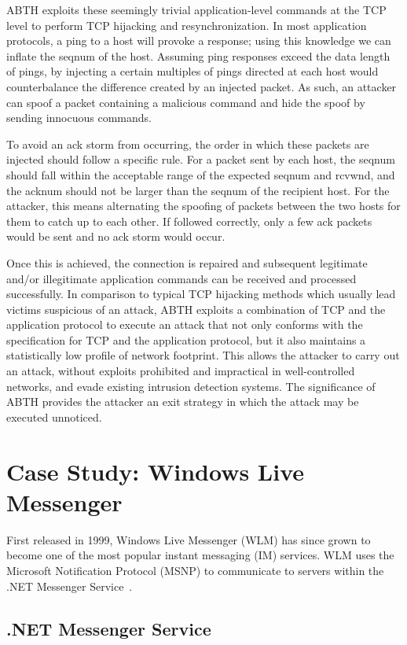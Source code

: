 \documentclass{sig-alternate}
\begin{document}
ABTH exploits these seemingly trivial application-level commands at the TCP level to perform TCP hijacking and resynchronization.
In most application protocols, a ping to a host will provoke a response; using this knowledge we can inflate the seqnum of the host.
Assuming ping responses exceed the data length of pings, by injecting a certain multiples of pings directed at each host would counterbalance the difference created by an injected packet.
As such, an attacker can spoof a packet containing a malicious command and hide the spoof by sending innocuous commands.

To avoid an ack storm from occurring, the order in which these packets are injected should follow a specific rule.
For a packet sent by each host, the seqnum should fall within the acceptable range of the expected seqnum and rcvwnd, and the acknum should not be larger than the seqnum of the recipient host.
For the attacker, this means alternating the spoofing of packets between the two hosts for them to catch up to each other.
If followed correctly, only a few ack packets would be sent and no ack storm would occur.

Once this is achieved, the connection is repaired and subsequent legitimate and/or illegitimate application commands can be received and processed successfully.
In comparison to typical TCP hijacking methods which usually lead victims suspicious of an attack, ABTH exploits a combination of TCP and the application protocol to execute an attack that not only conforms with the specification for TCP and the application protocol, but it also maintains a statistically low profile of network footprint.
This allows the attacker to carry out an attack, without exploits prohibited and impractical in well-controlled networks, and evade existing intrusion detection systems.
The significance of ABTH provides the attacker an exit strategy in which the attack may be executed unnoticed.

\section{Case Study: Windows Live Messenger}
\label{sec:casestudy}

First released in 1999, Windows Live Messenger (WLM) has since grown to become one of the most popular instant messaging (IM) services.
WLM uses the Microsoft Notification Protocol (MSNP) to communicate to servers within the .NET Messenger Service~\cite{piccard:imsecurity}.

\subsection{.NET Messenger Service}
\end{document}
